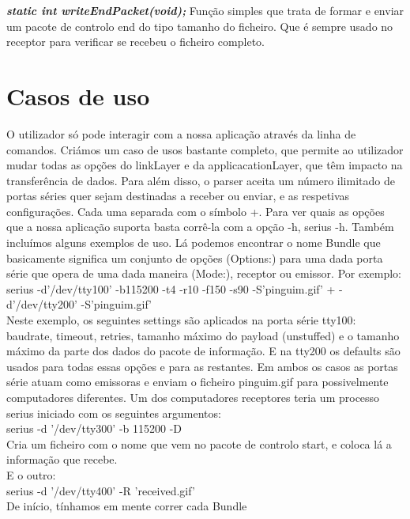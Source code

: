 \documentclass[a4paper]{article}
\begin{document}
\noindent\textbf{\textit{static int writeEndPacket(void);}}
Função simples que trata de formar e enviar um pacote de controlo end do tipo
tamanho do ficheiro. Que é sempre usado no receptor para verificar se recebeu o
ficheiro completo.

\section{Casos de uso}
O utilizador só pode interagir com a nossa aplicação através da linha de
comandos. Criámos um caso de usos bastante completo, que permite ao utilizador
mudar todas as opções do linkLayer e da applicacationLayer, que têm impacto na
transferência de dados. Para além disso, o parser aceita um número ilimitado de
portas séries quer sejam destinadas a receber ou enviar, e as respetivas
configurações. Cada uma separada com o símbolo +. Para ver quais as opções que
a nossa aplicação suporta basta corrê-la com a opção -h, serius -h. Também
incluímos alguns exemplos de uso. Lá podemos encontrar o nome Bundle que
basicamente significa um conjunto de opções (Options:) para uma dada porta
série que opera de uma dada maneira (Mode:), receptor ou emissor. Por
exemplo:\\\newline serius -d'/dev/tty100' -b115200 -t4 -r10 -f150 -s90
-S'pinguim.gif' + -d'/dev/tty200' -S'pinguim.gif'\\\newline Neste exemplo, os
seguintes settings são aplicados na porta série tty100: baudrate, timeout,
retries, tamanho máximo do payload (unstuffed) e o tamanho máximo da parte dos
dados do pacote de informação. E na tty200 os defaults são usados para todas
essas opções e para as restantes. Em ambos os casos as portas série atuam como
emissoras e enviam o ficheiro pinguim.gif para possivelmente computadores
diferentes. Um dos computadores receptores teria um processo serius iniciado
com os seguintes argumentos:\\\newline serius -d '/dev/tty300' -b 115200 -D\\
Cria um ficheiro com o nome que vem no pacote de controlo start, e coloca lá a
informação que recebe. \\\newline E o outro:\\\newline serius -d '/dev/tty400'
-R 'received.gif' \\\newline De início, tínhamos em mente correr cada Bundle
\end{document}
